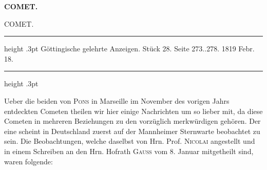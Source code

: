 \clearpage
\begingroup
\pagestyle{empty}
\newcommand{\GaussVIGathering}[2]{%
  \fancypagestyle{gaussVIGathering}{%
    \fancyhf{}%
    \renewcommand{\headrulewidth}{0pt}%
    \renewcommand{\footrulewidth}{0pt}%
    \fancyfoot[C]{\makebox[\textwidth][l]{%
      \hspace*{.025\textwidth}{\footnotesize\bfseries #1}\hfill
      {\normalsize\bfseries\textls[90]{#2}}\hspace*{.18\textwidth}}}%
  }%
  \thispagestyle{gaussVIGathering}%
}
\thispagestyle{empty}
\noindent{}%
\makebox[12mm][l]{}%
\parbox[t]{\dimexpr\linewidth-24mm\relax}{\centering\footnotesize\bfseries COMET.\par}%
\par\nobreak\medskip
\begin{center}
\Large COMET.
\end{center}
\begin{center}
\parbox{.76\linewidth}{%
\centering\small
\hrule height .3pt\relax\vspace{2.5pt}
Göttingische gelehrte Anzeigen. Stück 28. Seite 273..278. 1819 Febr. 18.\par
\vspace{2.5pt}\hrule height .3pt\relax
}
\end{center}

\par\indent Ueber die beiden von \textsc{Pons} in Marseille im November des vorigen Jahrs entdeckten
Cometen theilen wir hier einige Nachrichten um so lieber mit, da diese Cometen in
mehreren Beziehungen zu den vorzüglich merkwürdigen gehören. Der eine scheint in
Deutschland zuerst auf der Mannheimer Sternwarte beobachtet zu sein. Die
Beobachtungen, welche daselbst von Hrn. Prof. \textsc{Nicolai} angestellt und in einem
Schreiben an den Hrn. Hofrath \textsc{Gauss} vom 8. Januar mitgetheilt sind, waren folgende:

